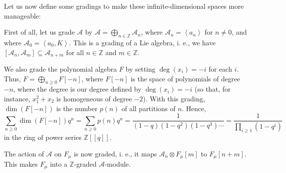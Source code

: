 \documentclass
[numbers=enddot,12pt,final,onecolumn,german,notitlepage]{scrartcl}%
\theoremstyle{definition}
\begin{document}
Let us now define some gradings to make these infinite-dimensional spaces more manageable:

First of all, let us grade $\mathcal{A}$ by $\mathcal{A}=\bigoplus
\limits_{n\in\mathbb{Z}}\mathcal{A}_{n}$, where $\mathcal{A}_{n}=\left\langle
a_{n}\right\rangle $ for $n\neq0$, and where $\mathcal{A}_{0}=\left\langle
a_{0},K\right\rangle $. This is a grading of a Lie algebra, i. e., we have
$\left[  \mathcal{A}_{n},\mathcal{A}_{m}\right]  \subseteq\mathcal{A}_{n+m}$
for all $n\in\mathbb{Z}$ and $m\in\mathbb{Z}$.

We also grade the polynomial algebra $F$ by setting $\deg\left(  x_{i}\right)
=-i$ for each $i$. Thus, $F=\bigoplus\limits_{n\geq0}F\left[  -n\right]  $,
where $F\left[  -n\right]  $ is the space of polynomials of degree $-n$, where
the degree is our degree defined by $\deg\left(  x_{i}\right)  =-i$ (so that,
for instance, $x_{1}^{2}+x_{2}$ is homogeneous of degree $-2$). With this
grading, $\dim\left(  F\left[  -n\right]  \right)  $ is the number $p\left(
n\right)  $ of all partitions of $n$. Hence,%
\[
\sum\limits_{n\geq0}\dim\left(  F\left[  -n\right]  \right)  q^{n}%
=\sum\limits_{n\geq0}p\left(  n\right)  q^{n}=\dfrac{1}{\left(  1-q\right)
\left(  1-q^{2}\right)  \left(  1-q^{3}\right)  \cdots}=\dfrac{1}%
{\prod\limits_{i\geq1}\left(  1-q^{i}\right)  }%
\]
in the ring of power series $\mathbb{Z}\left[  \left[  q\right]  \right]  $.

The action of $\mathcal{A}$ on $F_{\mu}$ is now graded, i. e., it maps
$\mathcal{A}_{n}\otimes F_{\mu}\left[  m\right]  $ to $F_{\mu}\left[
n+m\right]  $. This makes $F_{\mu}$ into a $\mathbb{Z}$-graded $\mathcal{A}$-module.
\end{document}
